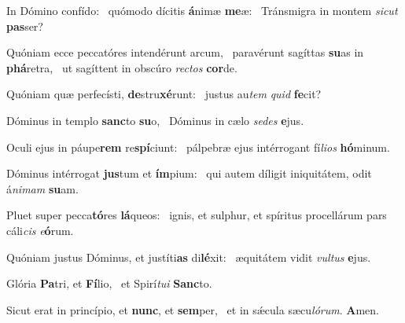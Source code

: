 \item In Dómino confído:~\pscross{} quómodo dícitis \textbf{á}nimæ \textbf{me}æ:~\psstar{} Tránsmigra in montem \textit{sicut} \textbf{pas}ser?
\item Quóniam ecce peccatóres intendérunt arcum,~\pscross{} paravérunt sagíttas \textbf{su}as in \textbf{phá}retra,~\psstar{} ut sagíttent in obscúro \textit{rectos} \textbf{cor}de.
\item Quóniam quæ perfecísti, \textbf{de}stru\textbf{xé}runt:~\psstar{} justus au\textit{tem} \textit{quid} \textbf{fe}cit?
\item Dóminus in templo \textbf{sanc}to \textbf{su}o,~\psstar{} Dóminus in cælo \textit{sedes} \textbf{e}jus.
\item Oculi ejus in páupe\textbf{rem} re\textbf{spí}ciunt:~\psstar{} pálpebræ ejus intérrogant fí\textit{lios} \textbf{hó}minum.
\item Dóminus intérrogat \textbf{jus}tum et \textbf{ím}pium:~\psstar{} qui autem díligit iniquitátem, odit á\textit{nimam} \textbf{su}am.
\item Pluet super pecca\textbf{tó}res \textbf{lá}queos:~\psstar{} ignis, et sulphur, et spíritus procellárum pars cáli\textit{cis} \textit{e}\textbf{ó}rum.
\item Quóniam justus Dóminus, et justíti\textbf{as} di\textbf{lé}xit:~\psstar{} æquitátem vidit \textit{vultus} \textbf{e}jus.
\item Glória \textbf{Pa}tri, et \textbf{Fí}lio,~\psstar{} et Spirí\textit{tui} \textbf{Sanc}to.
\item Sicut erat in princípio, et \textbf{nunc}, et \textbf{sem}per,~\psstar{} et in sǽcula sæcu\textit{lórum}. \textbf{A}men.
